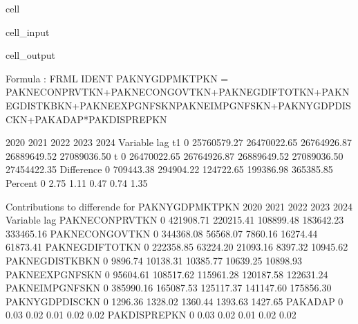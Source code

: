 \documentclass[letterpaper,10pt,english]{jupyterBook}
\begin{document}
\begin{sphinxuseclass}{cell}\begin{sphinxVerbatimInput}

\begin{sphinxuseclass}{cell_input}
\begin{sphinxVerbatim}[commandchars=\\\{\}]
 
    \PYG{p}{[}\PYG{p}{]}
\end{sphinxVerbatim}

\end{sphinxuseclass}\end{sphinxVerbatimInput}
\begin{sphinxVerbatimOutput}

\begin{sphinxuseclass}{cell_output}
\begin{sphinxVerbatim}[commandchars=\\\{\}]
Formula        : FRML \PYGZlt{}IDENT\PYGZgt{} PAKNYGDPMKTPKN = PAKNECONPRVTKN+PAKNECONGOVTKN+PAKNEGDIFTOTKN+PAKNEGDISTKBKN+PAKNEEXPGNFSKN\PYGZhy{}PAKNEIMPGNFSKN+PAKNYGDPDISCKN+PAKADAP*PAKDISPREPKN \PYGZdl{} 

                      2020        2021        2022        2023        2024
Variable   lag                                                            
t\PYGZhy{}1        0   25760579.27 26470022.65 26764926.87 26889649.52 27089036.50
t          0   26470022.65 26764926.87 26889649.52 27089036.50 27454422.35
Difference 0     709443.38   294904.22   124722.65   199386.98   365385.85
Percent    0          2.75        1.11        0.47        0.74        1.35

 Contributions to differende for  PAKNYGDPMKTPKN
                         2020       2021       2022       2023       2024
Variable       lag                                                       
PAKNECONPRVTKN 0    421908.71  220215.41  108899.48  183642.23  333465.16
PAKNECONGOVTKN 0    344368.08   56568.07   \PYGZhy{}7860.16   16274.44   61873.41
PAKNEGDIFTOTKN 0    222358.85   63224.20   21093.16    8397.32   10945.62
PAKNEGDISTKBKN 0      9896.74   10138.31   10385.77   10639.25   10898.93
PAKNEEXPGNFSKN 0     95604.61  108517.62  115961.28  120187.58  122631.24
PAKNEIMPGNFSKN 0   \PYGZhy{}385990.16 \PYGZhy{}165087.53 \PYGZhy{}125117.37 \PYGZhy{}141147.60 \PYGZhy{}175856.30
PAKNYGDPDISCKN 0      1296.36    1328.02    1360.44    1393.63    1427.65
PAKADAP        0        \PYGZhy{}0.03      \PYGZhy{}0.02      \PYGZhy{}0.01      \PYGZhy{}0.02      \PYGZhy{}0.02
PAKDISPREPKN   0        \PYGZhy{}0.03      \PYGZhy{}0.02      \PYGZhy{}0.01      \PYGZhy{}0.02      \PYGZhy{}0.02


\end{sphinxVerbatim}
\end{sphinxuseclass}
\end{sphinxVerbatimOutput}
\end{sphinxuseclass}
\end{document}
